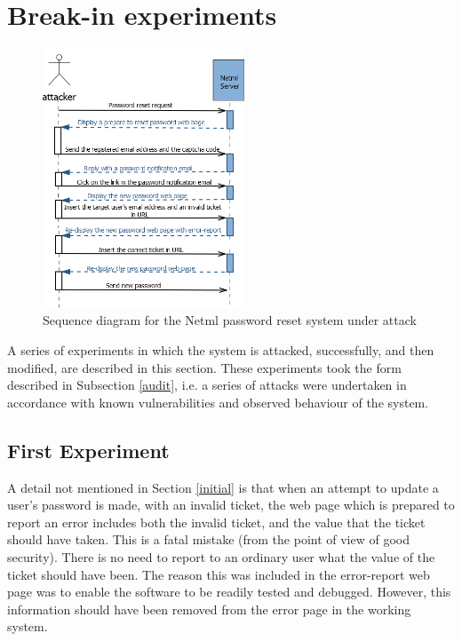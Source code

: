 \section{Break-in experiments}\label{expts}
\begin{figure}
	\centering
		\includegraphics[width=6cm]{figures/attacker.png}
\caption{Sequence diagram for the Netml password reset  system under attack }
\label{seqdgnetmlattack}
\end{figure}
A series of experiments in which the system is attacked,
successfully, and then modified, are described in this section.
These experiments took the form described in Subsection \ref{audit},
i.e. a series of attacks were undertaken in accordance with known
vulnerabilities and observed behaviour of the system.

\subsection{First Experiment}
A detail not mentioned in Section \ref{initial} is that when an attempt
to update a user's password is made, with an invalid ticket, the web 
page which is prepared to report an error includes both the invalid
ticket, and the value that the ticket should have taken. This is a fatal
mistake (from the point of view of good security). There is no need
to report to an ordinary user what the value of the ticket should
have been. The reason this was included in the error-report web page
was to enable the software to be readily tested and debugged. However,
this information should have been removed from the error page
in the working system.

